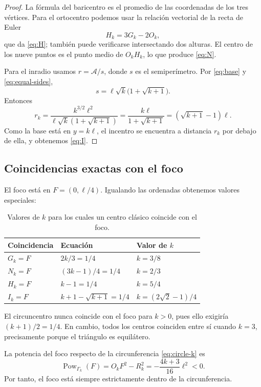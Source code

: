 \documentclass[11pt,a4paper,openany]{report}
\newcommand{\Area}{\mathcal{A}}
\begin{document}
\begin{proof}
La fórmula del baricentro es el promedio de las coordenadas de los tres vértices. Para el ortocentro podemos usar la relación vectorial de la recta de Euler
\[
 H_k=3G_k-2O_k,
\]
que da \eqref{eq:H}; también puede verificarse intersectando dos alturas. El centro de los nueve puntos es el punto medio de \(O_kH_k\), lo que produce \eqref{eq:N}.

Para el inradio usamos \(r=\Area/s\), donde \(s\) es el semiperímetro. Por \eqref{eq:base} y \eqref{eq:equal-sides},
\[
 s=\ell\sqrt{k}\bigl(1+\sqrt{k+1}\bigr).
\]
Entonces
\[
 r_k=\frac{k^{3/2}\ell^2}{\ell\sqrt{k}(1+\sqrt{k+1})}
 =\frac{k\ell}{1+\sqrt{k+1}}
 =(\sqrt{k+1}-1)\ell.
\]
Como la base está en \(y=k\ell\), el incentro se encuentra a distancia \(r_k\) por debajo de ella, y obtenemos \eqref{eq:I}.
\end{proof}

\subsection{Coincidencias exactas con el foco}

El foco está en \(F=(0,\ell/4)\). Igualando las ordenadas obtenemos valores especiales:

\begin{table}[H]
\centering
\caption{Valores de \(k\) para los cuales un centro clásico coincide con el foco.}
\begin{tabular}{lll}
\toprule
Coincidencia & Ecuación & Valor de \(k\)\\
\midrule
\(G_k=F\) & \(2k/3=1/4\) & \(k=3/8\)\\
\(N_k=F\) & \((3k-1)/4=1/4\) & \(k=2/3\)\\
\(H_k=F\) & \(k-1=1/4\) & \(k=5/4\)\\
\(I_k=F\) & \(k+1-\sqrt{k+1}=1/4\) & \(k=(2\sqrt2-1)/4\)\\
\bottomrule
\end{tabular}
\label{tab:center-focus}
\end{table}

El circuncentro nunca coincide con el foco para \(k>0\), pues ello exigiría \((k+1)/2=1/4\). En cambio, todos los centros coinciden entre sí cuando \(k=3\), precisamente porque el triángulo es equilátero.

\begin{remark}
La potencia del foco respecto de la circunferencia \eqref{eq:circle-k} es
\[
 \operatorname{Pow}_{\Gamma_k}(F)=O_kF^2-R_k^2
 =-\frac{4k+3}{16}\ell^2<0.
\]
Por tanto, el foco está siempre estrictamente dentro de la circunferencia.
\end{remark}
\end{document}
